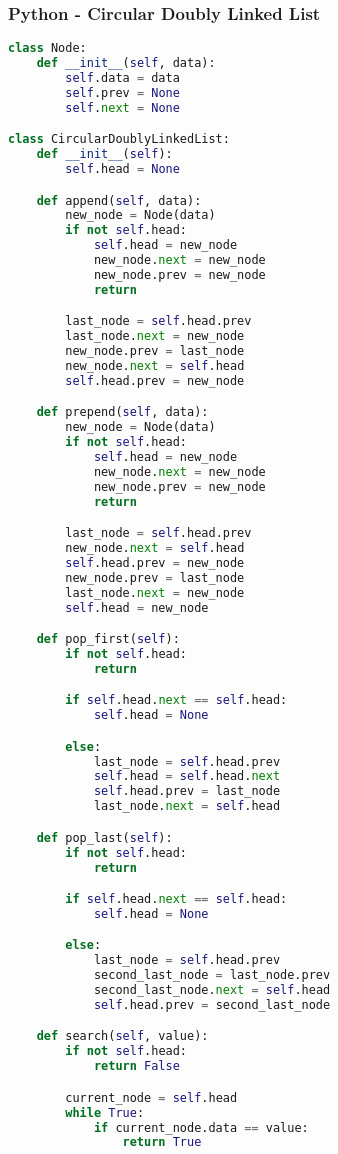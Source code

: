 \subsubsection{Python - Circular Doubly Linked List}

\begin{lstlisting}[language=Python]
class Node:
    def __init__(self, data):
        self.data = data
        self.prev = None
        self.next = None

class CircularDoublyLinkedList:
    def __init__(self):
        self.head = None

    def append(self, data):
        new_node = Node(data)
        if not self.head:
            self.head = new_node
            new_node.next = new_node
            new_node.prev = new_node
            return

        last_node = self.head.prev
        last_node.next = new_node
        new_node.prev = last_node
        new_node.next = self.head
        self.head.prev = new_node

    def prepend(self, data):
        new_node = Node(data)
        if not self.head:
            self.head = new_node
            new_node.next = new_node
            new_node.prev = new_node
            return

        last_node = self.head.prev
        new_node.next = self.head
        self.head.prev = new_node
        new_node.prev = last_node
        last_node.next = new_node
        self.head = new_node

    def pop_first(self):
        if not self.head:
            return

        if self.head.next == self.head:
            self.head = None

        else:
            last_node = self.head.prev
            self.head = self.head.next
            self.head.prev = last_node
            last_node.next = self.head

    def pop_last(self):
        if not self.head:
            return

        if self.head.next == self.head:
            self.head = None

        else:
            last_node = self.head.prev
            second_last_node = last_node.prev
            second_last_node.next = self.head
            self.head.prev = second_last_node

    def search(self, value):
        if not self.head:
            return False

        current_node = self.head
        while True:
            if current_node.data == value:
                return True


\end{lstlisting}
